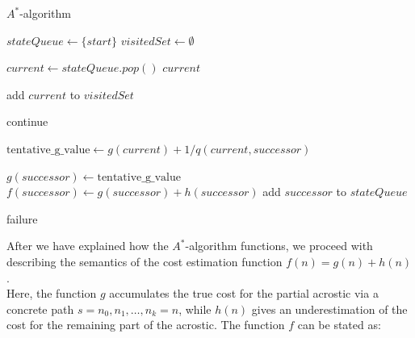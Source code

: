 \documentclass[11pt]{reportAlternative}
\begin{document}
\begin{algorithm}
\caption{$A^*$-algorithm}\label{Astar}
\begin{algorithmic}[1]




\State $stateQueue\gets \{start\}$
\State $visitedSet\gets \emptyset$

\State $current\gets stateQueue.pop()$
\State \Return $current$ 
\EndIf

\State add $current$ to $visitedSet$




			 \State continue
		\EndIf
			
		\State
		\State $\textrm{tentative\_g\_value} \gets g(current) + 1/q(current,successor)$		
		\State



			\State $g(successor)\gets \mathrm{tentative\_g\_value}$
			\State $f(successor)\gets g(successor) + h(successor)$
				\State add $successor$ to $stateQueue$
			\EndIf
		\EndIf

			

		


	\EndFor


			
			
	
	
	
	
	
				
			
\EndWhile			 
	




\Return failure
 



\EndFunction
\end{algorithmic}
\end{algorithm}


After we have explained how the $A^*$-algorithm functions, we proceed with describing the semantics of the cost estimation function $f(n)=g(n) + h(n)$.\\
Here, the function $g$ accumulates the true cost for the partial acrostic via a concrete path $s=n_0,n_1,\dots,n_k=n$, while $h(n)$ gives an underestimation of the cost for the remaining part of the acrostic. The function $f$ can be stated as:
  
\end{document}
